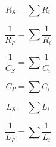 \begin{multicols}{2}
{        \vspace*{1.5ex}

        \begin{minipage}[c]{0.5\columnwidth}
            \begin{equation*}
                R_S = \sum{R_i}
            \end{equation*}
        \end{minipage}%
        \begin{minipage}[c]{0.5\columnwidth}
            \begin{equation*}
                \frac{1}{R_P} = \sum{\frac{1}{R_i}}
            \end{equation*}
        \end{minipage}

        \begin{minipage}[c]{0.5\columnwidth}
            \begin{equation*}
                \frac{1}{C_S} = \sum{\frac{1}{C_i}}
            \end{equation*}
        \end{minipage}%
        \begin{minipage}[c]{0.5\columnwidth}
            \begin{equation*}
                C_P = \sum{C_i}
            \end{equation*}
        \end{minipage}

        \begin{minipage}[c]{0.5\columnwidth}
            \begin{equation*}
                L_S = \sum{L_i}
            \end{equation*}
        \end{minipage}%
        \begin{minipage}[c]{0.5\columnwidth}
            \begin{equation*}
                \frac{1}{L_P} = \sum{\frac{1}{L_i}}
            \end{equation*}
        \end{minipage}

    }

\end{multicols}

